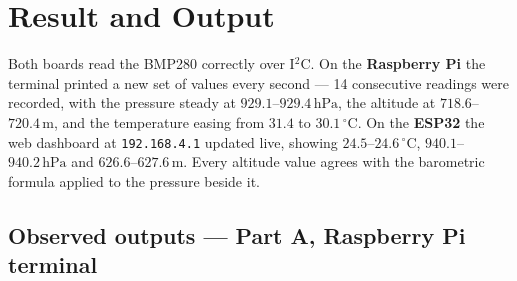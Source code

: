 \documentclass[10pt,a4paper]{article}
\begin{document}
\section{Result and Output}

\begin{keybox}
Both boards read the BMP280 correctly over I$^2$C. On the \textbf{Raspberry Pi} the
terminal printed a new set of values every second --- 14 consecutive readings were
recorded, with the pressure steady at $929.1$--$929.4\,\mathrm{hPa}$, the altitude at
$718.6$--$720.4\,\mathrm{m}$, and the temperature easing from $31.4$ to
$30.1\,^{\circ}\mathrm{C}$. On the \textbf{ESP32} the web dashboard at
\texttt{192.168.4.1} updated live, showing $24.5$--$24.6\,^{\circ}\mathrm{C}$,
$940.1$--$940.2\,\mathrm{hPa}$ and $626.6$--$627.6\,\mathrm{m}$. Every altitude value
agrees with the barometric formula applied to the pressure beside it.
\end{keybox}

\subsection*{Observed outputs --- Part A, Raspberry Pi terminal}
\end{document}
